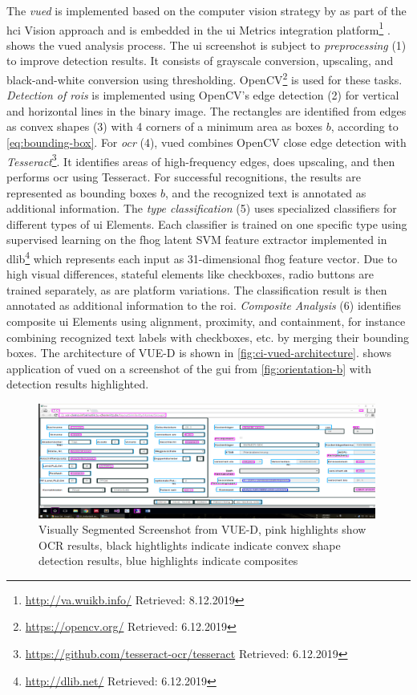 The \emph{\gls{vued}} is implemented based on the computer vision strategy by \citet{Kong2012} as part of the \gls{hci} Vision approach \autocite{Bakaev2019JWE,Bakaev2018ICWE} and is embedded in the \gls{ui} Metrics integration platform\footnote{\url{http://va.wuikb.info/} Retrieved: 8.12.2019} \autocite{Bakaev2019ICWE}.
 shows the \gls{vued} analysis process.
The \gls{ui} screenshot is subject to \emph{preprocessing} (1) to improve detection results.
It consists of grayscale conversion, upscaling, and black-and-white conversion using thresholding.
OpenCV\footnote{\url{https://opencv.org/} Retrieved: 6.12.2019} is used for these tasks.
\emph{Detection of \glspl{roi}} is implemented using OpenCV's edge detection (2) for vertical and horizontal lines in the binary image.
The rectangles are identified from edges as convex shapes (3) with 4 corners of a minimum area as boxes \(b\), according to \cref{eq:bounding-box}.
For \emph{\gls{ocr}} (4), \gls{vued} combines OpenCV close edge detection with \emph{Tesseract}\footnote{\url{https://github.com/tesseract-ocr/tesseract} Retrieved: 6.12.2019}.
It identifies areas of high-frequency edges, does upscaling, and then performs \gls{ocr} using Tesseract.
For successful recognitions, the results are represented as bounding boxes \(b\), and the recognized text is annotated as additional information.
The \emph{type classification} (5) uses specialized classifiers for different types of \gls{ui} Elements.
Each classifier is trained on one specific type using supervised learning on the \gls{fhog} latent SVM feature \autocite{Felzenszwalb2010FHOG} extractor implemented in dlib\footnote{\url{http://dlib.net/} Retrieved: 6.12.2019} which represents each input as 31-dimensional \gls{fhog} feature vector.
Due to high visual differences, stateful elements like checkboxes, radio buttons are trained separately, as are platform variations.
The classification result is then annotated as additional information to the \gls{roi}.
\emph{Composite Analysis} (6) identifies composite \gls{ui} Elements using alignment, proximity, and containment, for instance combining recognized text labels with checkboxes, etc.
by merging their bounding boxes.
The architecture of VUE-D is shown in \cref{fig:ci-vued-architecture}.
 shows application of \gls{vued} on a screenshot of the \gls{gui} from \cref{fig:orientation-b} with detection results highlighted.
\begin{figure}[hbt]
\hypertarget{fig:ui-recognition}{%
\centering
\includegraphics[width=0.99\textwidth]{../figures/segmented-wui.png}
\caption[Visually Segmented Screenshot from VUE-D]{Visually Segmented Screenshot from VUE-D, pink highlights show OCR results, black hightlights indicate indicate convex shape detection results, blue highlights indicate composites}\label{fig:ui-recognition}
}
\end{figure}
